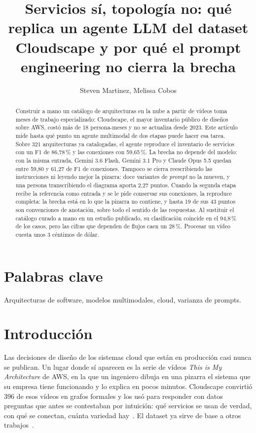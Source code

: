 \documentclass[a4paper, twocolumn, 10pt]{IEEEtran}
\title{Servicios sí, topología no: qué replica un agente LLM del dataset Cloudscape y por qué el prompt engineering no cierra la brecha}
\author{Steven Martinez, Melissa Cobos}
\begin{document}
\maketitle

\begin{abstract}
Construir a mano un catálogo de arquitecturas en la nube a partir de vídeos toma
meses de trabajo especializado: Cloudscape, el mayor inventario público de diseños
sobre AWS, costó más de 18 persona-meses y no se actualiza desde 2023. Este
artículo mide hasta qué punto un agente multimodal de dos etapas puede hacer esa
tarea. Sobre 321 arquitecturas ya catalogadas, el agente reproduce el inventario de
servicios con un F1 de 86,78\,\% y las conexiones con 59,65\,\%. La brecha no
depende del modelo: con la misma entrada, Gemini 3.6 Flash, Gemini 3.1 Pro y Claude
Opus 5.5 quedan entre 59,80 y 61,27 de F1 de conexiones. Tampoco se cierra
reescribiendo las instrucciones ni leyendo mejor la pizarra: doce variantes de
\emph{prompt} no la mueven, y una persona transcribiendo el diagrama aporta 2,27
puntos. Cuando la segunda etapa recibe la referencia como entrada y se le pide
conservar sus conexiones, la reproduce completa: la brecha está en lo que la
pizarra no contiene, y hasta 19 de sus 43 puntos son convenciones de anotación,
sobre todo el sentido de las respuestas. Al sustituir el catálogo curado a mano en
un estudio publicado, su clasificación coincide en el 94,8\,\% de los casos, pero
las cifras que dependen de flujos caen un 28\,\%. Procesar un vídeo cuesta unos
3 céntimos de dólar.
\end{abstract}

\section*{Palabras clave}
Arquitecturas de software, modelos multimodales, cloud, varianza de prompts.


\section{Introducción}

Las decisiones de diseño de los sistemas cloud que están en producción casi nunca
se publican. Un lugar donde sí aparecen es la serie de vídeos \emph{This is My
Architecture} de AWS, en la que un ingeniero dibuja en una pizarra el sistema que
su empresa tiene funcionando y lo explica en pocos minutos. Cloudscape convirtió
396 de esos vídeos en grafos formales y los usó para responder con datos
preguntas que antes se contestaban por intuición: qué servicios se usan de
verdad, con qué se conectan, cuánta variedad hay~\cite{satija2025cloudscape}. El
dataset ya sirve de base a otros trabajos~\cite{santillan2025hpc}.
\end{document}
